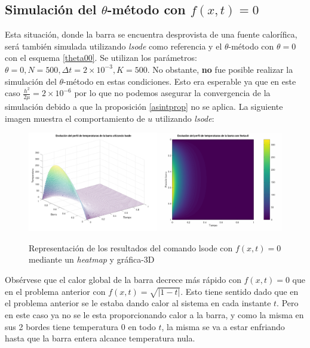 \documentclass{endm}
\begin{document}
\subsection{Simulación del $\theta$-método con $f(x,t)=0$}
Esta situación, donde la barra se encuentra desprovista de una fuente calorífica, será también simulada utilizando
\textit{lsode} como referencia y el $\theta$-método con $\theta=0$ con el esquema \ref{theta00}. Se utilizan los
parámetros: $\theta=0,N=500,\Delta t = 2\times 10^{-3},K=500$. No obstante, \textbf{no} fue posible realizar la simulación del
$\theta$-método en estas condiciones. Esto era esperable ya que en este caso $\frac{h^2}{2\mu}=2\times10^{-6}$ por lo que no podemos asegurar la convergencia de la simulación debido a que la proposición \ref{asintprop} no se aplica. La siguiente imagen muestra el comportamiento de $u$ utilizando \textit{lsode}:
\begin{figure}[H]
    \centering
    \includegraphics[scale=0.4]{snipf0.PNG}\label{fig:snipf0}
    \caption{Representación de los resultados del comando lsode con $f(x,t)=0$ mediante un \textit{heatmap} y gráfica-3D}
\end{figure}
Obsérvese que el calor global de la barra decrece más rápido con $f(x,t)=0$ que en el problema anterior con $f(x,t)=\sqrt{|1-t|}$. Esto tiene sentido dado que en el problema anterior se le estaba dando calor al sistema en cada instante $t$. Pero en este caso ya no se le esta proporcionando calor a la barra, y como la misma en sus 2 bordes tiene temperatura $0$ en todo $t$, la misma se va a estar enfriando hasta que la barra entera alcance temperatura nula.
\end{document}

